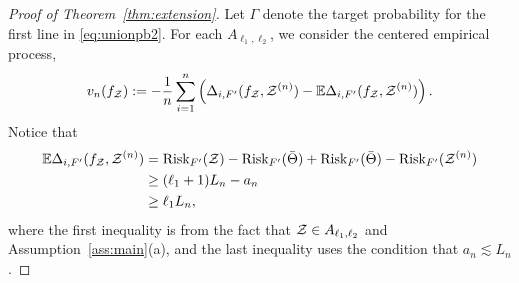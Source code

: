 \documentclass[11pt]{article}
\theoremstyle{plain}
\theoremstyle{definition}
\def\risk{\textup{Risk}}
\begin{document}
\begin{proof}[Proof of Theorem~\ref{thm:extension}]
Let $\Gamma$ denote the target probability for the first line in \eqref{eq:unionpb2}.   For each $A_{\ell_1,\ell_2}$, we consider the centered empirical process,
\begin{align}\label{eq:vn2}
v_n(f_{\mathcal{Z}}) := -\frac{1}{n}\sum_{i=1}^n \left(\Delta_{i,F'}(f_{\mathcal{Z}},\mathcal{Z}^{(n)})- \mathbb{E}\Delta_{i,F'}(f_{\mathcal{Z}},\mathcal{Z}^{(n)})\right).
\end{align}
Notice  that 
\begin{align}
 \mathbb{E}\Delta_{i,F'}(f_\tZ,\tZ^{(n)}) &=  \risk_{F'}({\tZ})-\risk_{F'}(\bar\Theta)+\risk_{F'}({\bar\Theta})-\risk_{F'}(\tZ^{(n)})\\&\geq (\ell_1+1)L_n-a_n\\&\geq \ell_1 L_n,
\end{align}
where the first inequality is from the fact that $\mathcal{Z}\in A_{\ell_1,\ell_2}$ and Assumption~\ref{ass:main}(a), and the last inequality uses the condition that $a_n\lesssim L_n$.


\end{proof}
\end{document}

